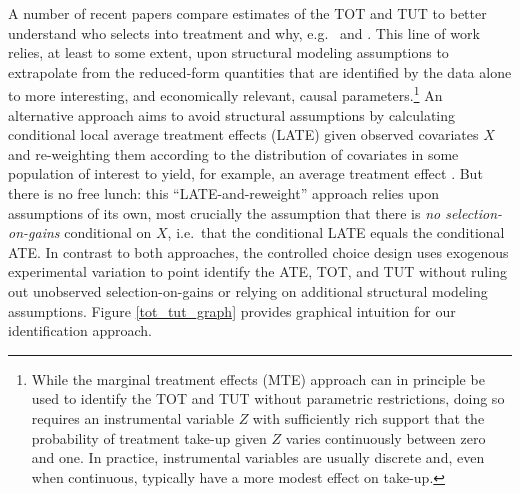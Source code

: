 \documentclass[11pt, a4paper]{article}
\begin{document}
A number of recent papers compare estimates of the TOT and TUT to better understand who selects into treatment and why, e.g.\ \cite{cornelissen2018benefits} and \cite{Walters}. 
This line of work relies, at least to some extent, upon structural modeling assumptions to extrapolate from the reduced-form quantities that are identified by the data alone to more interesting, and economically relevant, causal parameters.\footnote{While the marginal treatment effects (MTE) approach \citep{heckman2007econometric} can in principle be used to identify the TOT and TUT without parametric restrictions, doing so requires an instrumental variable $Z$ with sufficiently rich support that the probability of treatment take-up given $Z$ varies continuously between zero and one. In practice, instrumental variables are usually discrete and, even when continuous, typically have a more modest effect on take-up.} 
An alternative approach aims to avoid structural assumptions by calculating conditional local average treatment effects (LATE) given observed covariates $X$ and re-weighting them according to the distribution of covariates in some population of interest to yield, for example, an average treatment effect \citep{aronow2013beyond,angrist2013extrapolate}. 
But there is no free lunch: this ``LATE-and-reweight'' approach relies upon assumptions of its own, most crucially the assumption that there is \emph{no selection-on-gains} conditional on $X$, i.e.\ that the conditional LATE equals the conditional ATE. 
In contrast to both approaches, the controlled choice design uses exogenous experimental variation to point identify the ATE, TOT, and TUT without ruling out unobserved selection-on-gains or relying on additional structural modeling assumptions.
Figure \ref{tot_tut_graph} provides graphical intuition for our identification approach. %
\end{document}
